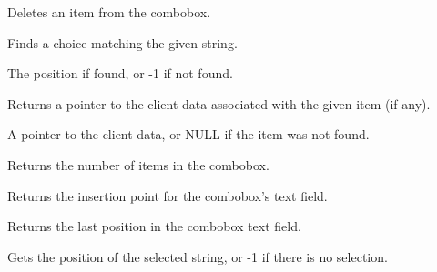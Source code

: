 Deletes an item from the combobox.



\label{wxcomboboxfindstring}


Finds a choice matching the given string.




The position if found, or -1 if not found.

\label{wxcomboboxgetclientdata}


Returns a pointer to the client data associated with the given item (if any).




A pointer to the client data, or NULL if the item was not found.

\label{wxcomboboxgetcount}


Returns the number of items in the combobox.

\label{wxcomboboxgetinsertionpoint}


Returns the insertion point for the combobox's text field.

\label{wxcomboboxgetlastposition}


Returns the last position in the combobox text field.

\label{wxcomboboxgetselection}


Gets the position of the selected string, or -1 if there is no selection.

